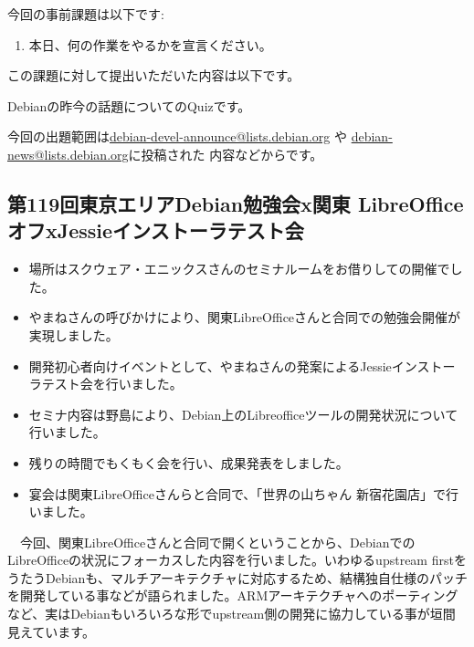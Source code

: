 \documentclass[mingoth,a4paper]{jsarticle}
\begin{document}

今回の事前課題は以下です:
\begin{enumerate}
 \item 本日、何の作業をやるかを宣言ください。
\end{enumerate}
この課題に対して提出いただいた内容は以下です。
\begin{multicols}{2}
{\small

}
\end{multicols}


 Debianの昨今の話題についてのQuizです。

今回の出題範囲は\url{debian-devel-announce@lists.debian.org} や \url{debian-news@lists.debian.org}に投稿された
内容などからです。

\begin{multicols}{2}

\end{multicols}


\subsection{第119回東京エリアDebian勉強会x関東 LibreOffice オフxJessieインストーラテスト会}

\begin{itemize}
\item 場所はスクウェア・エニックスさんのセミナルームをお借りしての開催でした。
\item やまねさんの呼びかけにより、関東LibreOfficeさんと合同での勉強会開催が実現しました。
\item 開発初心者向けイベントとして、やまねさんの発案によるJessieインストーラテスト会を行いました。
\item セミナ内容は野島により、Debian上のLibreofficeツールの開発状況について行いました。
\item 残りの時間でもくもく会を行い、成果発表をしました。
\item 宴会は関東LibreOfficeさんらと合同で、「世界の山ちゃん 新宿花園店」で行いました。
\end{itemize} 

　今回、関東LibreOfficeさんと合同で開くということから、DebianでのLibreOfficeの状況にフォーカスした内容を行いました。いわゆるupstream firstをうたうDebianも、マルチアーキテクチャに対応するため、結構独自仕様のパッチを開発している事などが語られました。ARMアーキテクチャへのポーティングなど、実はDebianもいろいろな形でupstream側の開発に協力している事が垣間見えています。
\end{document}
